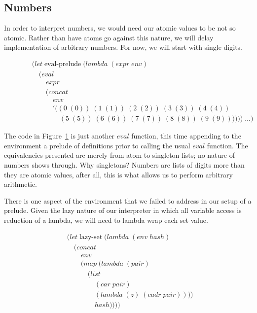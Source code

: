 \subsection{Numbers}
In order to interpret numbers, we would need our atomic values to be not so 
atomic. Rather than have atoms go against this nature, we will delay 
implementation of arbitrary numbers. For now, we will start with single 
digits.

\begin{figure}[htp]
\footnotesize
\caption{}\label{fig:evalPrelude}
\begin{align*}
& (let \; \text{eval-prelude} \; (lambda \; (expr \; env)
\\& \quad (eval \; 
\\& \qquad expr
\\& \qquad (concat \; 
\\& \qquad \quad env \; 
\\& \qquad \quad '((0 \; (0)) \; (1 \; (1)) \; (2 \; (2)) \; (3 \; (3)) \; (4 \; (4)) \; 
\\& \qquad \qquad (5 \; (5)) \; (6 \; (6)) \; (7 \; (7)) \; (8 \; (8)) \; (9 \; (9)))))) \; \dots)
\end{align*}
\end{figure}

The code in Figure~\ref{fig:evalPrelude} is just another $eval$ function, this
time appending to the environment a prelude of definitions prior to calling the
usual $eval$ function. The equivalencies presented are merely from atom to
singleton lists; no nature of numbers shows through. Why singletons? Numbers
are lists of digits more than they are atomic values, after all, this is what
allows us to perform arbitrary arithmetic.

There is one aspect of the environment that we failed to address in our setup 
of a prelude. Given the lazy nature of our interpreter in which all variable
access is reduction of a lambda, we will need to lambda wrap each set value.

\begin{figure}[htp]
\footnotesize
\caption{}\label{fig:lazySetDef}
\begin{align*}
& (let \; \text{lazy-set} \; (lambda \; (env \; hash)
\\& \quad (concat
\\& \qquad env
\\& \qquad (map \; (lambda \; (pair) \; 
\\& \qquad \quad (list \; 
\\& \qquad \qquad (car \; pair) \; 
\\& \qquad \qquad (lambda \; (z) \; (cadr \; pair)))) \; 
\\& \qquad \qquad hash))))
\end{align*}
\end{figure}

